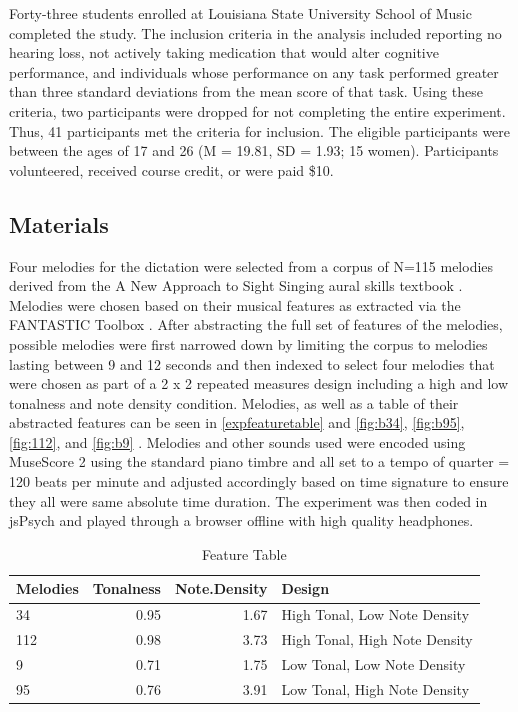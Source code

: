 \documentclass[12pt,]{book}
\begin{document}
Forty-three students enrolled at Louisiana State University School of Music completed the study.
The inclusion criteria in the analysis included reporting no hearing loss, not actively taking medication that would alter cognitive performance, and individuals whose performance on any task performed greater than three standard deviations from the mean score of that task.
Using these criteria, two participants were dropped for not completing the entire experiment.
Thus, 41 participants met the criteria for inclusion.
The eligible participants were between the ages of 17 and 26 (M = 19.81, SD = 1.93; 15 women).
Participants volunteered, received course credit, or were paid \$10.

\hypertarget{materials-1}{%
\subsection{Materials}\label{materials-1}}

Four melodies for the dictation were selected from a corpus of N=115 melodies derived from the A New Approach to Sight Singing aural skills textbook \citep{berkowitzNewApproachSight2011}.
Melodies were chosen based on their musical features as extracted via the FANTASTIC Toolbox \citep{mullensiefenFantasticFeatureANalysis2009}.
After abstracting the full set of features of the melodies, possible melodies were first narrowed down by limiting the corpus to melodies lasting between 9 and 12 seconds and then indexed to select four melodies that were chosen as part of a 2 x 2 repeated measures design including a high and low tonalness and note density condition.
Melodies, as well as a table of their abstracted features can be seen in \ref{expfeaturetable} and \ref{fig:b34}, \ref{fig:b95},\ref{fig:112}, and \ref{fig:b9} .
Melodies and other sounds used were encoded using MuseScore 2 using the standard piano timbre and all set to a tempo of quarter = 120 beats per minute and adjusted accordingly based on time signature to ensure they all were same absolute time duration.
The experiment was then coded in jsPsych \citep{deleeuwJsPsychJavaScriptLibrary2015} and played through a browser offline with high quality headphones.

\begin{table}[t]

\caption{\label{tab:expfeaturetable}Feature Table}
\centering
\begin{tabular}{lrrl}
\toprule
Melodies & Tonalness & Note.Density & Design\\
\midrule
34 & 0.95 & 1.67 & High Tonal, Low Note Density\\
112 & 0.98 & 3.73 & High Tonal, High Note Density\\
9 & 0.71 & 1.75 & Low Tonal,  Low Note Density\\
95 & 0.76 & 3.91 & Low Tonal,  High Note Density\\
\bottomrule
\end{tabular}
\end{table}
\end{document}
